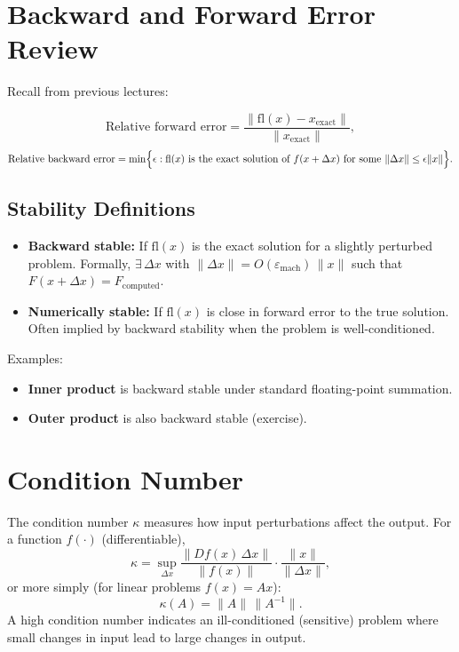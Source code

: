 \section{Backward and Forward Error Review}

Recall from previous lectures:

\[
\text{Relative forward error} 
= \frac{\|\mathrm{fl}(x) - x_{\mathrm{exact}}\|}{\|x_{\mathrm{exact}}\|},
\]
\[
\text{Relative backward error}
= \min\Bigl\{ \epsilon : \mathrm{fl}(x) 
   \text{ is the exact solution of } f(x+\Delta x) 
   \text{ for some } \|\Delta x\| \le \epsilon \|x\|\Bigr\}.
\]

\subsection{Stability Definitions}

\begin{itemize}
    \item \textbf{Backward stable:} If \(\mathrm{fl}(x)\) is the exact solution for a slightly perturbed problem. Formally, \(\exists\,\Delta x\) with \(\|\Delta x\| = O(\varepsilon_{\mathrm{mach}})\,\|x\|\) such that \(F(x+\Delta x) = F_{\mathrm{computed}}\).
    \item \textbf{Numerically stable:} If \(\mathrm{fl}(x)\) is close in forward error to the true solution. Often implied by backward stability when the problem is well-conditioned.
\end{itemize}

Examples:
\begin{itemize}
    \item \textbf{Inner product} is backward stable under standard floating-point summation.
    \item \textbf{Outer product} is also backward stable (exercise).
\end{itemize}

\section{Condition Number}

\noindent
The condition number \(\kappa\) measures how input perturbations affect the output. For a function \(f(\cdot)\) (differentiable),
\[
\kappa = \sup_{\Delta x} \frac{\|Df(x)\,\Delta x\|}{\|f(x)\|} 
         \cdot \frac{\|x\|}{\|\Delta x\|},
\]
or more simply (for linear problems \(f(x)=Ax\)):
\[
\kappa(A) = \|A\| \,\|A^{-1}\|.
\]
A high condition number indicates an ill-conditioned (sensitive) problem where small changes in input lead to large changes in output.

